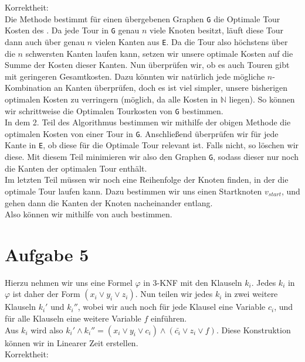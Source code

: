 \documentclass[a4paper,11pt]{scrartcl}
\renewcommand{\phi}{\varphi}
\begin{document}
	Korrektheit:\\
	Die Methode bestimmt für einen übergebenen Graphen \verb|G| die Optimale Tour Kosten des . Da jede Tour in \verb|G| genau $n$ viele Knoten besitzt, läuft diese Tour dann auch über genau $n$ vielen Kanten aus \verb|E|. Da die Tour also höchstens über die $n$ schwersten Kanten laufen kann, setzen wir unsere optimale Kosten auf die Summe der Kosten dieser Kanten. Nun überprüfen wir, ob es auch Touren gibt mit geringeren Gesamtkosten. Dazu könnten wir natürlich jede mögliche $n$-Kombination an Kanten überprüfen, doch es ist viel simpler, unsere bisherigen optimalen Kosten zu verringern (möglich, da alle Kosten in $\mathbb{N}$ liegen). So können wir schrittweise die Optimalen Tourkosten von \verb|G| bestimmen.\\
	In dem 2. Teil des Algorithmus bestimmen wir mithilfe der obigen Methode die optimalen Kosten von einer Tour in \verb|G|. Anschließend überprüfen wir für jede Kante in \verb|E|, ob diese für die Optimale Tour relevant ist. Falls nicht, so löschen wir diese. Mit diesem Teil minimieren wir also den Graphen \verb|G|, sodass dieser nur noch die Kanten der optimalen Tour enthält.\\
	Im letzten Teil müssen wir noch eine Reihenfolge der Knoten finden, in der die optimale Tour laufen kann. Dazu bestimmen wir uns einen Startknoten $v_{start}$, und gehen dann die Kanten der Knoten nacheinander entlang.\\
	Also können wir mithilfe von  auch  bestimmen.
	
\newpage	
	
	\section*{Aufgabe 5}
	Hierzu nehmen wir uns eine Formel $\phi$ in 3-KNF mit den Klauseln $k_i$.
	Jedes $k_i$ in $\phi$ ist daher der Form $(x_i \lor y_i \lor z_i)$. Nun teilen wir jedes $k_i$ in zwei weitere Klauseln $k_i'$ und $k_i''$, wobei wir auch noch für jede Klausel eine Variable $c_i$, und für alle Klauseln eine weitere Variable $f$ einführen.\\
	Aus $k_i$ wird also $k_i' \land k_i'' = (x_i \lor y_i \lor c_i) \land (\bar{c_i} \lor z_i \lor f)$.
	Diese Konstruktion können wir in Linearer Zeit erstellen.\\
	
	Korrektheit:\\
	
\end{document}
